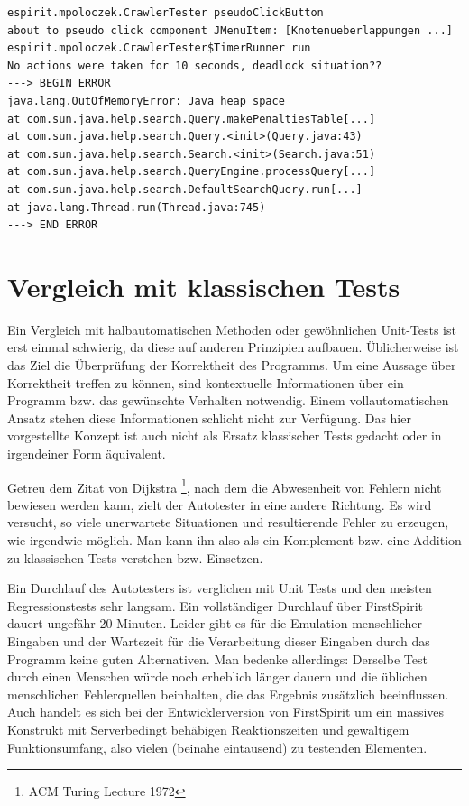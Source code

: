 \begin{lstlisting}[float=!ht,label=fmjson,caption={Ausnahme yEd durch Schaltfläche \glqq{}Knotenüberlappungen auflösen\grqq{}}]
espirit.mpoloczek.CrawlerTester pseudoClickButton
about to pseudo click component JMenuItem: [Knotenueberlappungen ...]
espirit.mpoloczek.CrawlerTester$TimerRunner run
No actions were taken for 10 seconds, deadlock situation??
---> BEGIN ERROR
java.lang.OutOfMemoryError: Java heap space
at com.sun.java.help.search.Query.makePenaltiesTable[...]
at com.sun.java.help.search.Query.<init>(Query.java:43)
at com.sun.java.help.search.Search.<init>(Search.java:51)
at com.sun.java.help.search.QueryEngine.processQuery[...]
at com.sun.java.help.search.DefaultSearchQuery.run[...]
at java.lang.Thread.run(Thread.java:745)
---> END ERROR
\end{lstlisting}



\section{Vergleich mit klassischen Tests}\label{section:testcomparisonclassic}

Ein Vergleich mit halbautomatischen Methoden oder gewöhnlichen Unit-Tests
ist erst einmal schwierig, da diese auf anderen Prinzipien aufbauen.
Üblicherweise ist das Ziel die Überprüfung der Korrektheit des Programms.
Um eine Aussage über Korrektheit treffen zu können, sind kontextuelle
Informationen über ein Programm bzw. das gewünschte Verhalten notwendig.
Einem vollautomatischen Ansatz stehen diese Informationen schlicht nicht
zur Verfügung. Das hier vorgestellte Konzept ist auch nicht als Ersatz 
klassischer Tests gedacht oder in irgendeiner Form äquivalent.

Getreu dem Zitat von Dijkstra \footnote{ACM Turing Lecture 1972},
nach dem die Abwesenheit von Fehlern nicht bewiesen werden kann,
zielt der Autotester in eine andere Richtung. Es wird versucht, so viele
unerwartete Situationen und resultierende Fehler zu erzeugen, wie
irgendwie möglich. Man kann ihn also als ein Komplement bzw. eine Addition
zu klassischen Tests verstehen bzw. Einsetzen.

Ein Durchlauf des Autotesters ist verglichen mit Unit Tests und den
meisten Regressionstests sehr langsam. Ein vollständiger Durchlauf
über FirstSpirit dauert ungefähr 20 Minuten. Leider gibt es für die
Emulation menschlicher Eingaben und der Wartezeit für die Verarbeitung
dieser Eingaben durch das Programm keine guten Alternativen.
Man bedenke allerdings: Derselbe Test durch einen Menschen würde
noch erheblich länger dauern und die üblichen menschlichen Fehlerquellen
beinhalten, die das Ergebnis zusätzlich beeinflussen. Auch handelt es
sich bei der Entwicklerversion von FirstSpirit um ein massives
Konstrukt mit Serverbedingt behäbigen Reaktionszeiten und gewaltigem
Funktionsumfang, also vielen (beinahe eintausend) zu testenden Elementen.
